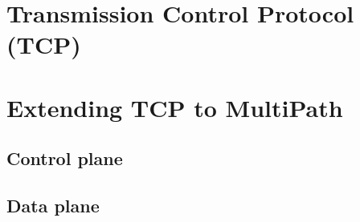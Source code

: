 \section{Transmission Control Protocol (TCP)}
\section{Extending TCP to MultiPath}
\subsection{Control plane}
\subsection{Data plane}